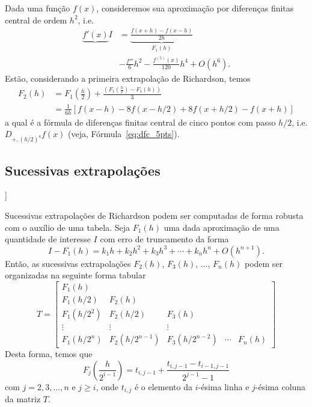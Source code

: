 \begin{ex}
  Dada uma função $f(x)$, consideremos sua aproximação por diferenças finitas central de ordem $h^2$, i.e.
  \begin{align}
    \underbrace{f'(x)}{I} &= \underbrace{\frac{f(x+h)-f(x-h)}{2h}}_{F_1(h)} \nonumber \\
                          &- \frac{f'''}{6}h^2 - \frac{f^{(5)}(x)}{120}h^4 + O(h^6).
  \end{align}
Estão, considerando a primeira extrapolação de Richardson, temos
\begin{align}
  F_2(h) &= F_1\left(\frac{h}{2}\right) + \frac{\left(F_1\left(\frac{h}{2}\right) - F_1(h)\right)}{3}\\
  &= \frac{1}{6h}\left[f(x-h)-8f(x-h/2)+8f(x+h/2)-f(x+h)\right]
\end{align}
a qual é a fórmula de diferenças finitas central de cinco pontos com passo $h/2$, i.e. $D_{+,(h/2)^4}f(x)$ (veja, Fórmula~\eqref{eq:dfc_5pts}).
\end{ex}

\subsection{Sucessivas extrapolações}

\begin{flushleft}
  [[tag:revisar]]
\end{flushleft}

Sucessivas extrapolações de Richardson podem ser computadas de forma robusta com o auxílio de uma tabela. Seja $F_1(h)$ uma dada aproximação de uma quantidade de interesse $I$ com erro de truncamento da forma
\begin{equation}
  I-F_1(h) = k_1h + k_2h^2 + k_3h^3 + \cdots + k_nh^n + O(h^{n+1}).
\end{equation}
Então, as sucessivas extrapolações $F_2(h)$, $F_3(h)$, $\dotsc$, $F_n(h)$ podem ser organizadas na seguinte forma tabular
\begin{equation}
  T = \left[\begin{array}{lllll}
    F_1(h)\\
    F_1(h/2) & F_2(h) \\
    F_1(h/2^2) & F_2(h/2) & F_3(h) \\
    \vdots & \vdots & \vdots \\
    F_1(h/2^n) & F_2(h/2^{n-1}) & F_3(h/2^{n-2}) & \cdots & F_n(h)
  \end{array}\right]
\end{equation}
Desta forma, temos que
\begin{equation}
  F_j\left(\frac{h}{2^{i-1}}\right) = t_{i,j-1} + \frac{t_{i,j-1}-t_{i-1,j-1}}{2^{j-1}-1}
\end{equation}
com $j=2, 3, \dotsc, n$ e $j\geq i$, onde $t_{i,j}$ é o elemento da $i$-ésima linha e $j$-ésima coluna da matriz $T$.

